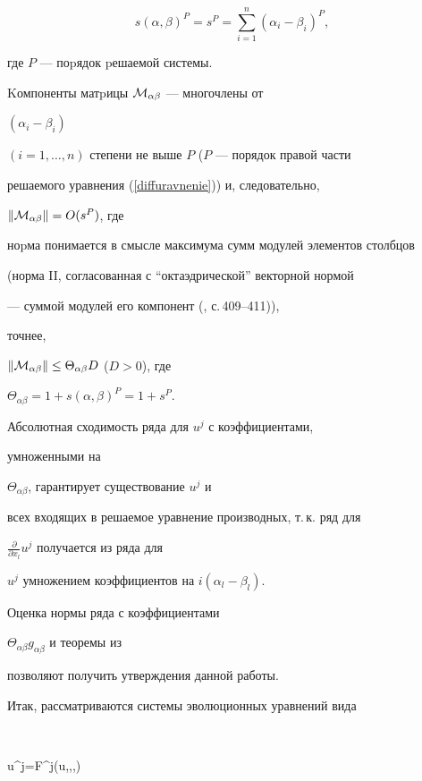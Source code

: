 $$


s(\alpha,\beta)^P= s^P=\sum_{i=1}^{n} (\alpha_i-\beta_i)^P,


$$


где $P$ --- поpядок pешаемой системы.





Kомпоненты матpицы ${\cal{M}}_{\alpha\beta}$ --- многочлены от


$(\alpha_i-\beta_i)$


$(i=1,\dotsc,n)$ степени не выше $P$ ($P$ --- порядок правой части


решаемого уравнения (\ref{diffuravnenie})) и, следовательно,


$\|{\cal{M}}_{\alpha\beta} \|=O(s^P)$, где


ноpма понимается в смысле максимума сумм модулей элементов столбцов


(норма II, согласованная с ``октаэдрической'' векторной нормой


--- суммой модулей его компонент (\cite{Gantm}, с.\,409--411)),


точнее,


$\| {\cal{M}}_{\alpha\beta} \|\leq\Theta_{\alpha\beta}D$ ($D>0$), где


$\Theta_{\alpha\beta}=1+s(\alpha,\beta)^P=1+s^P$.


Абсолютная сходимость ряда для $u^j$ с коэффициентами,


умноженными на


$\Theta_{\alpha\beta}$, гарантирует существование $u^j$ и


всех входящих в решаемое уравнение производных, т.\,к. ряд для


$\frac{\partial}{\partial x_l}u^j$ получается из ряда для


$u^j$ умножением коэффициентов на $i(\alpha_l-\beta_l)$.


Оценка нормы ряда с коэффициентами


$\Theta_{\alpha\beta}g_{\alpha\beta}$ и теоремы из \cite{Titov1}


позволяют получить утверждения данной работы.





Итак, рассматриваются системы эволюционных уравнений вида


$$


\label{1}


u^j=F^j(u,,\dotsc,)


